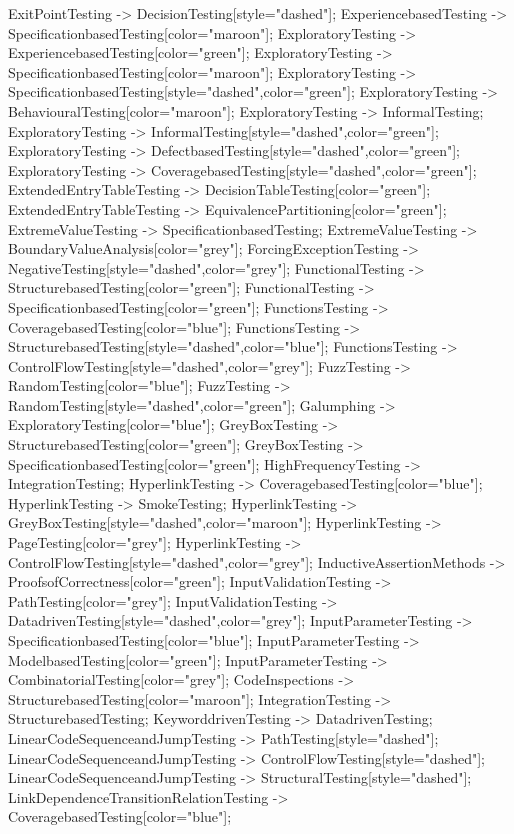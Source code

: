 \documentclass{article}
\begin{document}
{ExitPointTesting -> DecisionTesting[style="dashed"];
ExperiencebasedTesting -> SpecificationbasedTesting[color="maroon"];
ExploratoryTesting -> ExperiencebasedTesting[color="green"];
ExploratoryTesting -> SpecificationbasedTesting[color="maroon"];
ExploratoryTesting -> SpecificationbasedTesting[style="dashed",color="green"];
ExploratoryTesting -> BehaviouralTesting[color="maroon"];
ExploratoryTesting -> InformalTesting;
ExploratoryTesting -> InformalTesting[style="dashed",color="green"];
ExploratoryTesting -> DefectbasedTesting[style="dashed",color="green"];
ExploratoryTesting -> CoveragebasedTesting[style="dashed",color="green"];
ExtendedEntryTableTesting -> DecisionTableTesting[color="green"];
ExtendedEntryTableTesting -> EquivalencePartitioning[color="green"];
ExtremeValueTesting -> SpecificationbasedTesting;
ExtremeValueTesting -> BoundaryValueAnalysis[color="grey"];
ForcingExceptionTesting -> NegativeTesting[style="dashed",color="grey"];
FunctionalTesting -> StructurebasedTesting[color="green"];
FunctionalTesting -> SpecificationbasedTesting[color="green"];
FunctionsTesting -> CoveragebasedTesting[color="blue"];
FunctionsTesting -> StructurebasedTesting[style="dashed",color="blue"];
FunctionsTesting -> ControlFlowTesting[style="dashed",color="grey"];
FuzzTesting -> RandomTesting[color="blue"];
FuzzTesting -> RandomTesting[style="dashed",color="green"];
Galumphing -> ExploratoryTesting[color="blue"];
GreyBoxTesting -> StructurebasedTesting[color="green"];
GreyBoxTesting -> SpecificationbasedTesting[color="green"];
HighFrequencyTesting -> IntegrationTesting;
HyperlinkTesting -> CoveragebasedTesting[color="blue"];
HyperlinkTesting -> SmokeTesting;
HyperlinkTesting -> GreyBoxTesting[style="dashed",color="maroon"];
HyperlinkTesting -> PageTesting[color="grey"];
HyperlinkTesting -> ControlFlowTesting[style="dashed",color="grey"];
InductiveAssertionMethods -> ProofsofCorrectness[color="green"];
InputValidationTesting -> PathTesting[color="grey"];
InputValidationTesting -> DatadrivenTesting[style="dashed",color="grey"];
InputParameterTesting -> SpecificationbasedTesting[color="blue"];
InputParameterTesting -> ModelbasedTesting[color="green"];
InputParameterTesting -> CombinatorialTesting[color="grey"];
CodeInspections -> StructurebasedTesting[color="maroon"];
IntegrationTesting -> StructurebasedTesting;
KeyworddrivenTesting -> DatadrivenTesting;
LinearCodeSequenceandJumpTesting -> PathTesting[style="dashed"];
LinearCodeSequenceandJumpTesting -> ControlFlowTesting[style="dashed"];
LinearCodeSequenceandJumpTesting -> StructuralTesting[style="dashed"];
LinkDependenceTransitionRelationTesting -> CoveragebasedTesting[color="blue"];
}
\end{document}
